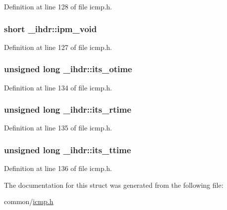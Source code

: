 \-Definition at line 128 of file icmp.\-h.

\hypertarget{struct__ihdr_a59e303100965e4ba3abcfbb90f545777}{
\subsubsection[{ipm\-\_\-void}]{\setlength{\rightskip}{0pt plus 5cm}short {\bf \-\_\-ihdr\-::ipm\-\_\-void}}}\label{struct__ihdr_a59e303100965e4ba3abcfbb90f545777}


\-Definition at line 127 of file icmp.\-h.

\hypertarget{struct__ihdr_ab1bce9ee647c42e7cfde5e468a7efc68}{
\subsubsection[{its\-\_\-otime}]{\setlength{\rightskip}{0pt plus 5cm}unsigned long {\bf \-\_\-ihdr\-::its\-\_\-otime}}}\label{struct__ihdr_ab1bce9ee647c42e7cfde5e468a7efc68}


\-Definition at line 134 of file icmp.\-h.

\hypertarget{struct__ihdr_aee743926bb7e5899d42114210be1f525}{
\subsubsection[{its\-\_\-rtime}]{\setlength{\rightskip}{0pt plus 5cm}unsigned long {\bf \-\_\-ihdr\-::its\-\_\-rtime}}}\label{struct__ihdr_aee743926bb7e5899d42114210be1f525}


\-Definition at line 135 of file icmp.\-h.

\hypertarget{struct__ihdr_a686540f5bc58f7930d80493be9e6d117}{
\subsubsection[{its\-\_\-ttime}]{\setlength{\rightskip}{0pt plus 5cm}unsigned long {\bf \-\_\-ihdr\-::its\-\_\-ttime}}}\label{struct__ihdr_a686540f5bc58f7930d80493be9e6d117}


\-Definition at line 136 of file icmp.\-h.



\-The documentation for this struct was generated from the following file\-:\begin{DoxyCompactItemize}
\item 
common/\hyperlink{icmp_8h}{icmp.\-h}\end{DoxyCompactItemize}
